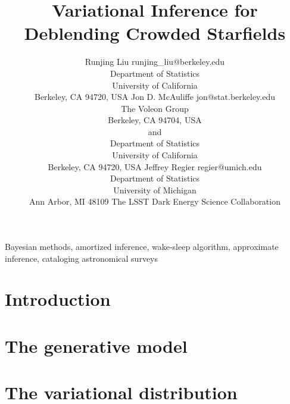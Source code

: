 \documentclass[twoside,11pt]{article}
\begin{document}
\title{Variational Inference for Deblending Crowded Starfields}

\author{\name Runjing Liu
    \email runjing\_liu@berkeley.edu \\
    \addr Department of Statistics\\
    University of California\\
    Berkeley, CA 94720, USA
    \AND
    \name Jon D. McAuliffe
    \email jon@stat.berkeley.edu \\
    \addr
    The Voleon Group \\
    Berkeley, CA 94704, USA \\
    and\\
    Department of Statistics\\
    University of California\\
    Berkeley, CA 94720, USA
    \AND
    \name Jeffrey Regier
    \email regier@umich.edu \\
    \addr
    Department of Statistics \\
    University of Michigan \\
    Ann Arbor, MI 48109
    \AND
    \name The LSST Dark Energy Science Collaboration
    }

\editor{}

\maketitle

\begin{abstract}%

\end{abstract}

\begin{keywords}
  Bayesian methods, amortized inference, wake-sleep algorithm, approximate inference, cataloging astronomical surveys
\end{keywords}

\section{Introduction}
\label{sec:intro}


\section{The generative model}
\label{sec:gen_model}


\section{The variational distribution}
\label{sec:var_inference}

\end{document}
